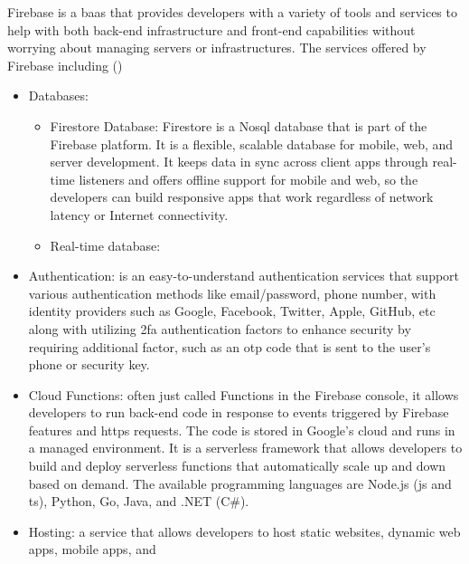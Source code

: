 \begin{multicols}{2}
      Firebase is a \acrshort{baas} that provides developers with a variety of tools and services to help with both
      back-end infrastructure and front-end capabilities without worrying about managing servers or infrastructures.
      The services offered by Firebase including (\cite{firebaseproducts})
      \begin{itemize}
            \item Databases: 
            \begin{itemize}
                  \item Firestore Database: Firestore is a No\acrshort{sql} database that is part of the Firebase 
                  platform. It is a flexible, scalable database for mobile, web, and server development. It keeps 
                  data in sync across client apps through real-time listeners and offers offline support for mobile 
                  and web, so the developers can build responsive apps that work regardless of network latency or 
                  Internet connectivity.
                  \item Real-time database:
            \end{itemize}
            \item Authentication: is an easy-to-understand authentication services that support various authentication
                  methods like email/password, phone number, with identity providers such as Google, Facebook, Twitter,
                  Apple, GitHub, \acrshort{etc}
                  along with utilizing \acrshort{2fa} authentication factors to enhance security by requiring additional
                  factor, such as an \acrshort{otp} code that is sent to the user's phone or security key.
            \item Cloud Functions: often just called Functions in the Firebase console, it allows developers to run 
                  back-end code in response to events triggered by Firebase features and \acrshort{https} requests. 
                  The code is stored in Google's cloud and runs in a managed environment. It is a serverless framework
                  that allows developers to build and deploy serverless functions that automatically scale up and down
                  based on demand. The available programming languages are Node.js (\acrshort{js} and \acrshort{ts}), 
                  Python, Go, Java, and .NET (C\#).
            \item Hosting: a service that allows developers to host static websites, dynamic web apps, mobile apps, and 

\end{itemize}
\end{multicols}
